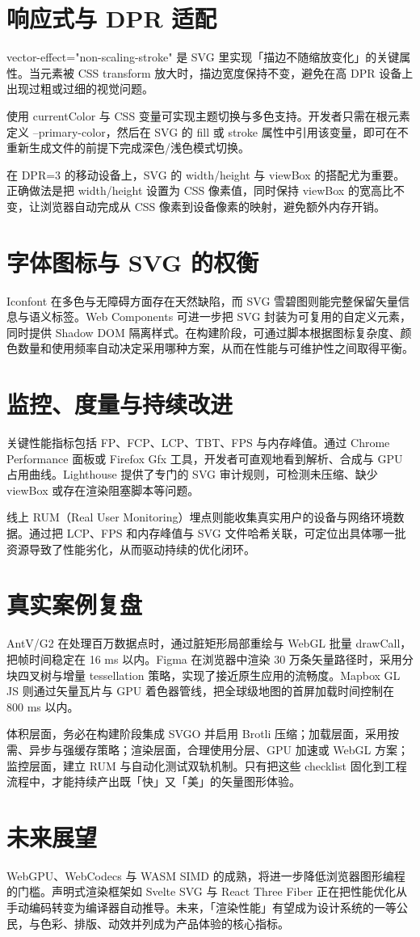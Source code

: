 \section{响应式与 DPR 适配}
vector-effect="non-scaling-stroke" 是 SVG 里实现「描边不随缩放变化」的关键属性。当元素被 CSS transform 放大时，描边宽度保持不变，避免在高 DPR 设备上出现过粗或过细的视觉问题。\par
使用 currentColor 与 CSS 变量可实现主题切换与多色支持。开发者只需在根元素定义 --primary-color，然后在 SVG 的 fill 或 stroke 属性中引用该变量，即可在不重新生成文件的前提下完成深色/浅色模式切换。\par
在 DPR=3 的移动设备上，SVG 的 width/height 与 viewBox 的搭配尤为重要。正确做法是把 width/height 设置为 CSS 像素值，同时保持 viewBox 的宽高比不变，让浏览器自动完成从 CSS 像素到设备像素的映射，避免额外内存开销。\par
\section{字体图标与 SVG 的权衡}
Iconfont 在多色与无障碍方面存在天然缺陷，而 SVG 雪碧图则能完整保留矢量信息与语义标签。Web Components 可进一步把 SVG 封装为可复用的自定义元素，同时提供 Shadow DOM 隔离样式。在构建阶段，可通过脚本根据图标复杂度、颜色数量和使用频率自动决定采用哪种方案，从而在性能与可维护性之间取得平衡。\par
\section{监控、度量与持续改进}
关键性能指标包括 FP、FCP、LCP、TBT、FPS 与内存峰值。通过 Chrome Performance 面板或 Firefox Gfx 工具，开发者可直观地看到解析、合成与 GPU 占用曲线。Lighthouse 提供了专门的 SVG 审计规则，可检测未压缩、缺少 viewBox 或存在渲染阻塞脚本等问题。\par
线上 RUM（Real User Monitoring）埋点则能收集真实用户的设备与网络环境数据。通过把 LCP、FPS 和内存峰值与 SVG 文件哈希关联，可定位出具体哪一批资源导致了性能劣化，从而驱动持续的优化闭环。\par
\section{真实案例复盘}
AntV/G2 在处理百万数据点时，通过脏矩形局部重绘与 WebGL 批量 drawCall，把帧时间稳定在 16 ms 以内。Figma 在浏览器中渲染 30 万条矢量路径时，采用分块四叉树与增量 tessellation 策略，实现了接近原生应用的流畅度。Mapbox GL JS 则通过矢量瓦片与 GPU 着色器管线，把全球级地图的首屏加载时间控制在 800 ms 以内。\par
体积层面，务必在构建阶段集成 SVGO 并启用 Brotli 压缩；加载层面，采用按需、异步与强缓存策略；渲染层面，合理使用分层、GPU 加速或 WebGL 方案；监控层面，建立 RUM 与自动化测试双轨机制。只有把这些 checklist 固化到工程流程中，才能持续产出既「快」又「美」的矢量图形体验。\par
\section{未来展望}
WebGPU、WebCodecs 与 WASM SIMD 的成熟，将进一步降低浏览器图形编程的门槛。声明式渲染框架如 Svelte SVG 与 React Three Fiber 正在把性能优化从手动编码转变为编译器自动推导。未来，「渲染性能」有望成为设计系统的一等公民，与色彩、排版、动效并列成为产品体验的核心指标。\par
